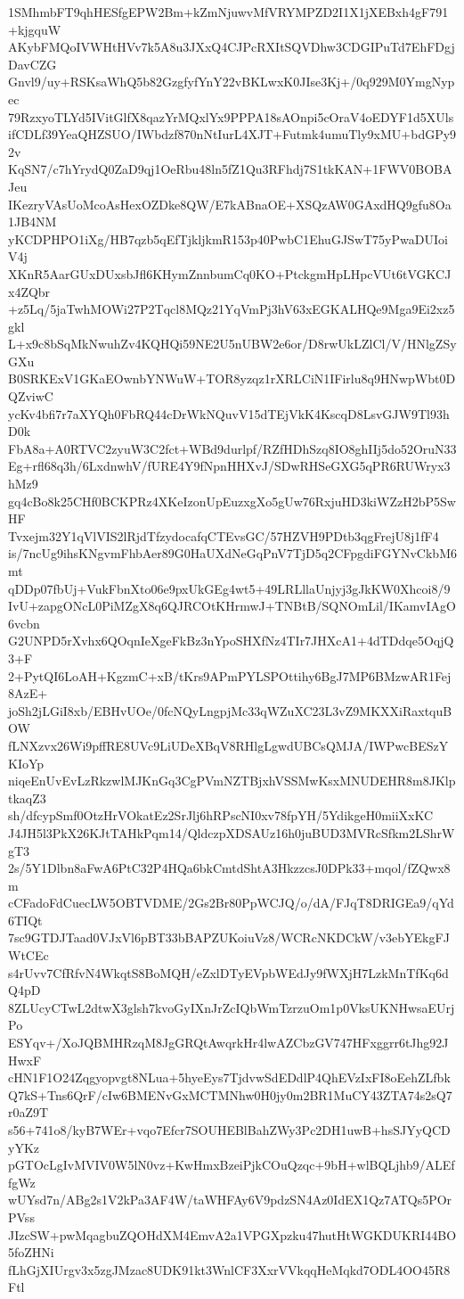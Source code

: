 1SMhmbFT9qhHESfgEPW2Bm+kZmNjuwvMfVRYMPZD2I1X1jXEBxh4gF791+kjgquW
AKybFMQoIVWHtHVv7k5A8u3JXxQ4CJPcRXItSQVDhw3CDGIPuTd7EhFDgjDavCZG
Gnvl9/uy+RSKsaWhQ5b82GzgfyfYnY22vBKLwxK0JIse3Kj+/0q929M0YmgNypec
79RzxyoTLYd5IVitGlfX8qazYrMQxlYx9PPPA18sAOnpi5cOraV4oEDYF1d5XUls
ifCDLf39YeaQHZSUO/IWbdzf870nNtIurL4XJT+Futmk4umuTly9xMU+bdGPy92v
KqSN7/c7hYrydQ0ZaD9qj1OeRbu48ln5fZ1Qu3RFhdj7S1tkKAN+1FWV0BOBAJeu
IKezryVAsUoMcoAsHexOZDke8QW/E7kABnaOE+XSQzAW0GAxdHQ9gfu8Oa1JB4NM
yKCDPHPO1iXg/HB7qzb5qEfTjkljkmR153p40PwbC1EhuGJSwT75yPwaDUIoiV4j
XKnR5AarGUxDUxsbJfl6KHymZnnbumCq0KO+PtckgmHpLHpcVUt6tVGKCJx4ZQbr
+z5Lq/5jaTwhMOWi27P2Tqcl8MQz21YqVmPj3hV63xEGKALHQe9Mga9Ei2xz5gkl
L+x9c8bSqMkNwuhZv4KQHQi59NE2U5nUBW2e6or/D8rwUkLZlCl/V/HNlgZSyGXu
B0SRKExV1GKaEOwnbYNWuW+TOR8yzqz1rXRLCiN1IFirlu8q9HNwpWbt0DQZviwC
ycKv4bfi7r7aXYQh0FbRQ44cDrWkNQuvV15dTEjVkK4KscqD8LsvGJW9Tl93hD0k
FbA8a+A0RTVC2zyuW3C2fct+WBd9durlpf/RZfHDhSzq8IO8ghIIj5do52OruN33
Eg+rfl68q3h/6LxdnwhV/fURE4Y9fNpnHHXvJ/SDwRHSeGXG5qPR6RUWryx3hMz9
gq4cBo8k25CHf0BCKPRz4XKeIzonUpEuzxgXo5gUw76RxjuHD3kiWZzH2bP5SwHF
Tvxejm32Y1qVlVIS2lRjdTfzydocafqCTEvsGC/57HZVH9PDtb3qgFrejU8j1fF4
is/7ncUg9ihsKNgvmFhbAer89G0HaUXdNeGqPnV7TjD5q2CFpgdiFGYNvCkbM6mt
qDDp07fbUj+VukFbnXto06e9pxUkGEg4wt5+49LRLllaUnjyj3gJkKW0Xhcoi8/9
IvU+zapgONcL0PiMZgX8q6QJRCOtKHrmwJ+TNBtB/SQNOmLil/IKamvIAgO6vcbn
G2UNPD5rXvhx6QOqnIeXgeFkBz3nYpoSHXfNz4TIr7JHXcA1+4dTDdqe5OqjQ3+F
2+PytQI6LoAH+KgzmC+xB/tKrs9APmPYLSPOttihy6BgJ7MP6BMzwAR1Fej8AzE+
joSh2jLGiI8xb/EBHvUOe/0fcNQyLngpjMc33qWZuXC23L3vZ9MKXXiRaxtquBOW
fLNXzvx26Wi9pffRE8UVc9LiUDeXBqV8RHlgLgwdUBCsQMJA/IWPwcBESzYKIoYp
niqeEnUvEvLzRkzwlMJKnGq3CgPVmNZTBjxhVSSMwKsxMNUDEHR8m8JKlptkaqZ3
sh/dfcypSmf0OtzHrVOkatEz2SrJlj6hRPscNI0xv78fpYH/5YdikgeH0miiXxKC
J4JH5l3PkX26KJtTAHkPqm14/QldczpXDSAUz16h0juBUD3MVRcSfkm2LShrWgT3
2s/5Y1Dlbn8aFwA6PtC32P4HQa6bkCmtdShtA3HkzzcsJ0DPk33+mqol/fZQwx8m
cCFadoFdCuecLW5OBTVDME/2Gs2Br80PpWCJQ/o/dA/FJqT8DRIGEa9/qYd6TIQt
7sc9GTDJTaad0VJxVl6pBT33bBAPZUKoiuVz8/WCRcNKDCkW/v3ebYEkgFJWtCEc
s4rUvv7CfRfvN4WkqtS8BoMQH/eZxlDTyEVpbWEdJy9fWXjH7LzkMnTfKq6dQ4pD
8ZLUcyCTwL2dtwX3glsh7kvoGyIXnJrZcIQbWmTzrzuOm1p0VksUKNHwsaEUrjPo
ESYqv+/XoJQBMHRzqM8JgGRQtAwqrkHr4lwAZCbzGV747HFxggrr6tJhg92JHwxF
cHN1F1O24Zqgyopvgt8NLua+5hyeEys7TjdvwSdEDdlP4QhEVzIxFI8oEehZLfbk
Q7kS+Tns6QrF/cIw6BMENvGxMCTMNhw0H0jy0m2BR1MuCY43ZTA74s2sQ7r0aZ9T
s56+741o8/kyB7WEr+vqo7Efcr7SOUHEBlBahZWy3Pc2DH1uwB+hsSJYyQCDyYKz
pGTOcLgIvMVIV0W5lN0vz+KwHmxBzeiPjkCOuQzqc+9bH+wlBQLjhb9/ALEffgWz
wUYsd7n/ABg2s1V2kPa3AF4W/taWHFAy6V9pdzSN4Az0IdEX1Qz7ATQs5POrPVss
JIzcSW+pwMqagbuZQOHdXM4EmvA2a1VPGXpzku47hutHtWGKDUKRI44BO5foZHNi
fLhGjXIUrgv3x5zgJMzac8UDK91kt3WnlCF3XxrVVkqqHeMqkd7ODL4OO45R8Ftl
